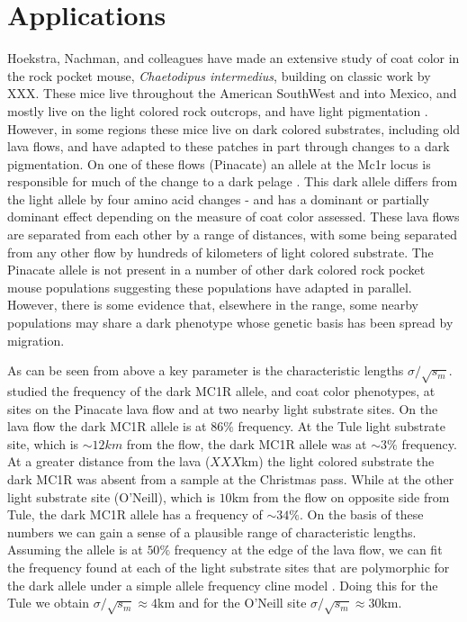 \documentclass{article}
\begin{document}
\section{Applications} 
Hoekstra, Nachman, and colleagues have made an extensive study of coat color in the rock pocket mouse, \emph{Chaetodipus intermedius}, building on classic work by XXX. These mice live throughout the American SouthWest and into Mexico, and mostly live on the light colored rock outcrops, and have light pigmentation \citep[presumably an adaptation to visual-based predators][]{}. However, in some regions these mice live on dark colored substrates, including old lava flows, and have adapted to these patches in part through changes to a dark pigmentation. On one of these flows (Pinacate) an allele at the Mc1r locus is responsible for much of the change to a dark pelage \citep{Nachman:03}. This dark allele differs from the light allele by four amino acid changes - and has a dominant or partially dominant effect depending on the measure of coat color assessed. These lava flows are separated from each other by a range of distances, with some being separated from any other flow by hundreds of kilometers of light colored substrate. The Pinacate allele is not present in a number of other dark colored rock pocket mouse populations suggesting these populations have adapted in parallel. However, there is some evidence \citep{Hoekstra:05} that, elsewhere in the range, some nearby populations may share a dark phenotype whose genetic basis has been spread by migration. 

As can be seen from above a key parameter is the characteristic lengths $\sigma/\sqrt{s_m}$. \citep{Hoekstra:04} studied the frequency of the dark MC1R allele, and coat color phenotypes, at sites on the Pinacate lava flow and at two nearby light substrate sites.
 On the lava flow the dark MC1R allele is at $86\%$ frequency. At the Tule light substrate site, which is $\sim 12km$ from the flow, the dark MC1R allele was at $\sim 3\%$ frequency. 
At a greater distance from the lava ($XXX$km) the light colored substrate the dark MC1R was absent from a sample at the Christmas pass. 
While at the other light substrate site (O'Neill), which is $10$km from the flow on opposite side from Tule, the dark MC1R allele has a frequency of $\sim 34\%$. On the basis of these numbers we can gain a sense of a plausible range of characteristic lengths.
Assuming the allele is at $50\%$ frequency at the edge of the lava flow, 
we can fit the frequency found at each of the light substrate sites that are 
polymorphic for the dark allele under a simple allele frequency cline model \citep{XXX}.
Doing this for the Tule we obtain $\sigma/\sqrt{s_m} \approx 4$km and for the O'Neill site
$\sigma/\sqrt{s_m} \approx 30$km. \\
\end{document}
